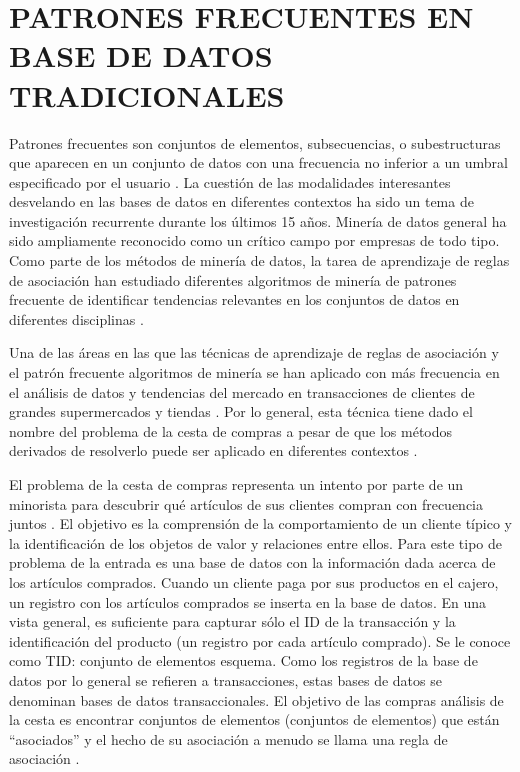\section{PATRONES FRECUENTES EN BASE DE DATOS TRADICIONALES}

Patrones frecuentes son conjuntos de elementos, subsecuencias, o subestructuras que aparecen en un conjunto de datos con una
frecuencia no inferior a un umbral especificado por el usuario \cite{han2007frequent}. La cuestión de las modalidades 
interesantes desvelando en las bases de datos en diferentes contextos ha sido un tema de investigación
recurrente durante los últimos 15 años. Minería de datos general ha sido ampliamente reconocido como un
crítico campo por empresas de todo tipo. Como parte de los métodos de minería de datos, la tarea de aprendizaje 
de reglas de asociación han estudiado diferentes algoritmos de minería de patrones frecuente de identificar tendencias relevantes en los conjuntos de datos en diferentes disciplinas \cite{creighton2003mining} \cite{miller2009geographic} \cite{zhang2002association}. 

Una de las áreas en las que las técnicas de aprendizaje de reglas de asociación y el patrón frecuente 
algoritmos de minería se han aplicado con más frecuencia en el análisis de datos y tendencias del
mercado en transacciones de clientes de grandes supermercados y tiendas \cite{agrawal1994fast}. Por lo general, esta técnica 
tiene dado el nombre del problema de la cesta de compras a pesar de que los métodos derivados de resolverlo puede ser aplicado en diferentes contextos \cite{han2006data}.

El problema de la cesta de compras representa un intento por parte de un minorista para descubrir qué 
artículos de sus clientes compran con frecuencia juntos \cite{tsur1998query}. El objetivo es la comprensión de la 
comportamiento de un cliente típico y la identificación de los objetos de valor y relaciones 
entre ellos. Para este tipo de problema de la entrada es una base de datos con la información dada 
acerca de los artículos comprados. Cuando un cliente paga por sus productos en el cajero, un registro 
con los artículos comprados se inserta en la base de datos. En una vista general, es suficiente para 
capturar sólo el ID de la transacción y la identificación del producto (un registro por cada artículo comprado). 
Se le conoce como {TID: conjunto de elementos} esquema. Como los registros de la base de datos por lo general se refieren a 
transacciones, estas bases de datos se denominan bases de datos transaccionales. El objetivo de las compras 
análisis de la cesta es encontrar conjuntos de elementos (conjuntos de elementos) que están ``asociados'' y el hecho de 
su asociación a menudo se llama una regla de asociación \cite{tsur1998query}. 

